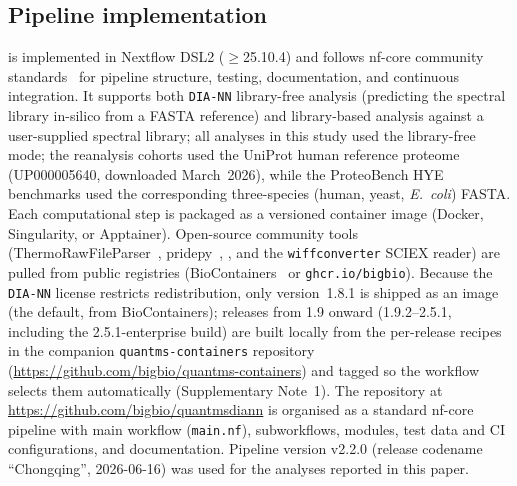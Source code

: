 \documentclass[preprint,12pt]{elsarticle}
\begin{document}
\subsection{Pipeline implementation}
\label{sec:impl}

\quantmsdiann{} is implemented in Nextflow DSL2 ($\geq$25.10.4) and follows nf-core community standards~\cite{ewels2020nfcore} for pipeline structure, testing, documentation, and continuous integration. It supports both \texttt{DIA-NN} library-free analysis (predicting the spectral library in-silico from a FASTA reference) and library-based analysis against a user-supplied spectral library; all analyses in this study used the library-free mode; the reanalysis cohorts used the UniProt human reference proteome~\cite{uniprot2025} (UP000005640, downloaded March~2026), while the ProteoBench HYE benchmarks used the corresponding three-species (human, yeast, \textit{E.\ coli}) FASTA. Each computational step is packaged as a versioned container image (Docker, Singularity, or Apptainer). Open-source community tools (ThermoRawFileParser~\cite{hulstaert2020}, pridepy~\cite{kamatchinathan2025pridepy}, \qpx{}, and the \texttt{wiffconverter} SCIEX reader) are pulled from public registries (BioContainers~\cite{biocontainers2017} or \texttt{ghcr.io/bigbio}).
Because the \texttt{DIA-NN} license restricts redistribution, only version~1.8.1 is shipped as an image (the default, from BioContainers); releases from 1.9 onward (1.9.2--2.5.1, including the 2.5.1-enterprise build) are built locally from the per-release recipes in the companion \texttt{quantms-containers} repository (\url{https://github.com/bigbio/quantms-containers}) and tagged so the workflow selects them automatically (Supplementary Note~1). The repository at \url{https://github.com/bigbio/quantmsdiann} is organised as a standard nf-core pipeline with main workflow (\texttt{main.nf}), subworkflows, modules, test data and CI configurations, and documentation. Pipeline version v2.2.0 (release codename ``Chongqing'', 2026-06-16) was used for the analyses reported in this paper.
\end{document}
